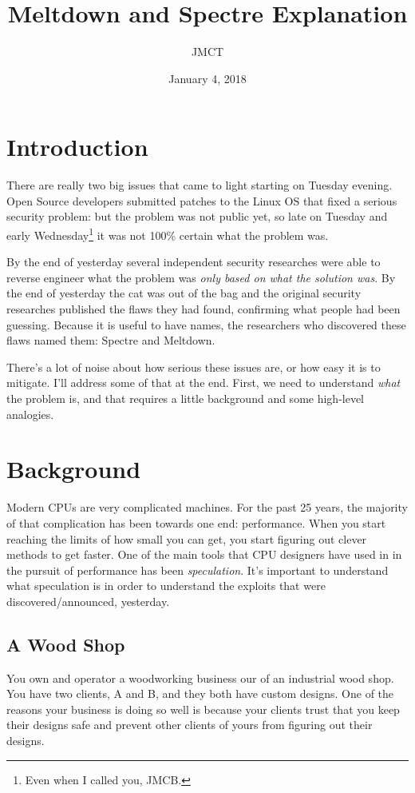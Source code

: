 \documentclass{article}
\title{Meltdown and Spectre Explanation}
\author{JMCT}
\date{January 4, 2018}
\begin{document}
\maketitle

\section{Introduction}

There are really two big issues that came to light starting on Tuesday evening.
Open Source developers submitted patches to the Linux OS that fixed a serious
security problem: but the problem was not public yet, so late on Tuesday and
early Wednesday\footnote{Even when I called you, JMCB.} it was not 100\%
certain what the problem was.

By the end of yesterday several independent security researches were able to
reverse engineer what the problem was \emph{only based on what the solution
was}. By the end of yesterday the cat was out of the bag and the original
security researches published the flaws they had found, confirming what people
had been guessing. Because it is useful to have names, the researchers who
discovered these flaws named them: Spectre and Meltdown.

There's a lot of noise about how serious these issues are, or how easy it is to
mitigate. I'll address some of that at the end. First, we need to understand
\emph{what} the problem is, and that requires a little background and some
high-level analogies.

\section{Background}

Modern CPUs are very complicated machines. For the past 25 years, the majority
of that complication has been towards one end: performance. When you start
reaching the limits of how small you can get, you start figuring out clever
methods to get faster. One of the main tools that CPU designers have used in in
the pursuit of performance has been \emph{speculation}. It's important to
understand what speculation is in order to understand the exploits that were
discovered/announced, yesterday.

\subsection*{A Wood Shop}

You own and operator a woodworking business our of an industrial wood shop. You
have two clients, A and B, and they both have custom designs. One of the
reasons your business is doing so well is because your clients trust that you
keep their designs safe and prevent other clients of yours from figuring out
their designs.
\end{document}
